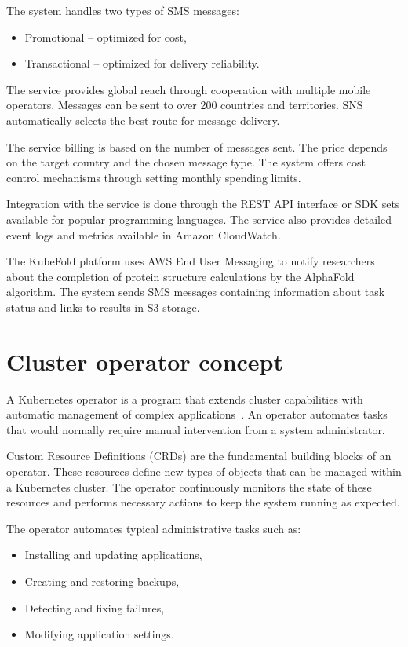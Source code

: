The system handles two types of SMS messages:
\begin{itemize}
    \item Promotional -- optimized for cost,
    \item Transactional -- optimized for delivery reliability.
\end{itemize}

The service provides global reach through cooperation with multiple mobile operators.
Messages can be sent to over 200 countries and territories.
SNS automatically selects the best route for message delivery.

The service billing is based on the number of messages sent.
The price depends on the target country and the chosen message type.
The system offers cost control mechanisms through setting monthly spending limits.

Integration with the service is done through the REST API interface or SDK sets available for popular programming languages.
The service also provides detailed event logs and metrics available in Amazon CloudWatch.

The KubeFold platform uses AWS End User Messaging to notify researchers about the completion of protein structure calculations by the AlphaFold algorithm.
The system sends SMS messages containing information about task status and links to results in S3 storage.


\section{Cluster operator concept}

A Kubernetes operator is a program that extends cluster capabilities with automatic management of complex applications~\cite{k8s_operators}.
An operator automates tasks that would normally require manual intervention from a system administrator.

Custom Resource Definitions (CRDs) are the fundamental building blocks of an operator.
These resources define new types of objects that can be managed within a Kubernetes cluster.
The operator continuously monitors the state of these resources and performs necessary actions to keep the system running as expected.

The operator automates typical administrative tasks such as:
\begin{itemize}
    \item Installing and updating applications,
    \item Creating and restoring backups,
    \item Detecting and fixing failures,
    \item Modifying application settings.
\end{itemize}

